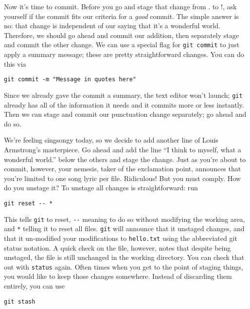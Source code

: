 \par{
Now it's time to commit. Before you go and stage that change from . to !, ask
yourself if the commit fits our criteria for a \emph{good} commit. The simple
answer is no: that change is independent of our saying that it's a wonderful
world. Therefore, we should go ahead and commit our addition, then separately
stage and commit the other change. We can use a special flag for \verb+git commit+ 
to just apply a summary message; these are pretty straightforward
changes. You can do this via
}

\begin{verbatim}
git commit -m "Message in quotes here"
\end{verbatim}

\par{
Since we already gave the commit a summary, the text editor won't launch;
\verb+git+ already has all of the information it needs and it commits more or
less instantly. Then we can stage and commit our punctuation change
separately; go ahead and do so. 
}

\par{
We're feeling singsongy today, so we decide to add another line of Louis
Armstrong's masterpiece. Go ahead and add the line ``I think to myself, what a
wonderful world.'' below the others and stage the change. Just as you're about
to commit, however, your nemesis, taker of the exclamation point, announces
that you're limited to one song lyric per file. Ridiculous! But you must
comply. How do you unstage it? To unstage all changes is straightforward: run
}

\begin{verbatim}
git reset -- *
\end{verbatim}

\par{
This tells \verb+git+ to reset, \verb+--+ meaning to do so without modifying
the working area, and \verb+*+ telling it to reset all files.
\verb+git+ will announce that it unstaged changes, and that it un-modified
your modifications to \verb+hello.txt+ using the abbreviated git status
notation. A quick check on the file, however, notes that despite being
unstaged, the file is still unchanged in the working directory. You can check
that out with \verb+status+ again. Often times when you get to the point of
staging things, you would like to keep those changes somewhere. Instead of
discarding them entirely, you can use
}

\begin{verbatim}
git stash
\end{verbatim}

